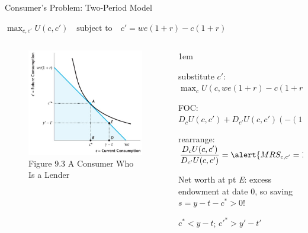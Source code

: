 \documentclass[11pt,aspectratio=43]{beamer}
\let\olditemize=\itemize
\let\endolditemize=\enditemize
\renewenvironment{itemize}{\olditemize \itemsep1em}{\endolditemize}
\theoremstyle{definition}
\begin{document}
\begin{frame}{Consumer's Problem: Two-Period Model}
\label{slide:Consumer_s_Problem__Two_Period_Model}
    \begin{center}
        $\displaystyle \max_{c, c'} U( c, c' ) \quad \text{subject to} \quad c' = we( 1+r ) - c( 1+r )$
    \end{center}
    \begin{columns}
        \begin{column}{0.4\textwidth}
            \begin{figure}
                \caption{\scriptsize Figure 9.3 A Consumer Who Is a Lender}
                \includegraphics[width=\textwidth]{./figures/Figure9_3.jpg}
            \end{figure}
        \end{column}
        \begin{column}{0.6\textwidth}
            \begin{itemize}
                \item substitute $ c' $: $ \displaystyle \max_{c} U( c, we( 1+r ) - c( 1+r ) ) $
                \item FOC: $ \displaystyle D_{c} U( c, c' ) + D_{c'} U( c, c' ) ( -( 1+r ) ) = 0 $
                \item rearrange: $ \displaystyle \frac{D_{c}U( c, c' )}{D_{c'}U( c, c' )} = \alert{MRS_{c, c'} = 1+r} $
                \item Net worth at pt \textit{E}: excess endowment at date 0, so saving $ s = y - t - c^{*} > 0 $!
                \item $ c^{*} < y - t $; $ c'^{*} > y' - t'$
            \end{itemize}
        \end{column}
    \end{columns}
\end{frame}
\end{document}
